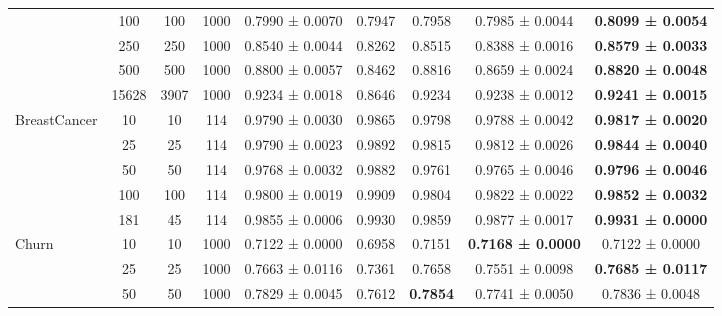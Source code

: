 \begin{table}
{\begin{tabular}[H]{@{}lcccccccc@{}}
                              & 100   & 100  & 1000 & 0.7990 ± 0.0070      & 0.7947               & 0.7958          & 0.7985 ± 0.0044          & \textbf{0.8099 ± 0.0054} \\
                              & 250   & 250  & 1000 & 0.8540 ± 0.0044      & 0.8262               & 0.8515          & 0.8388 ± 0.0016          & \textbf{0.8579 ± 0.0033} \\
                              & 500   & 500  & 1000 & 0.8800 ± 0.0057      & 0.8462               & 0.8816          & 0.8659 ± 0.0024          & \textbf{0.8820 ± 0.0048} \\
                              & 15628 & 3907 & 1000 & 0.9234 ± 0.0018      & 0.8646               & 0.9234          & 0.9238 ± 0.0012          & \textbf{0.9241 ± 0.0015} \\
                              \midrule
\multirow{5}{*}{BreastCancer} & 10    & 10   & 114  & 0.9790 ± 0.0030      & 0.9865               & 0.9798          & 0.9788 ± 0.0042          & \textbf{0.9817 ± 0.0020} \\
                              & 25    & 25   & 114  & 0.9790 ± 0.0023      & 0.9892               & 0.9815          & 0.9812 ± 0.0026          & \textbf{0.9844 ± 0.0040} \\
                              & 50    & 50   & 114  & 0.9768 ± 0.0032      & 0.9882               & 0.9761          & 0.9765 ± 0.0046          & \textbf{0.9796 ± 0.0046} \\
                              & 100   & 100  & 114  & 0.9800 ± 0.0019      & 0.9909               & 0.9804          & 0.9822 ± 0.0022          & \textbf{0.9852 ± 0.0032} \\
                              & 181   & 45   & 114  & 0.9855 ± 0.0006      & 0.9930               & 0.9859          & 0.9877 ± 0.0017          & \textbf{0.9931 ± 0.0000} \\
                              \midrule
\multirow{7}{*}{Churn}        & 10    & 10   & 1000 & 0.7122 ± 0.0000      & 0.6958               & 0.7151          & \textbf{0.7168 ± 0.0000} & 0.7122 ± 0.0000          \\
                              & 25    & 25   & 1000 & 0.7663 ± 0.0116      & 0.7361               & 0.7658          & 0.7551 ± 0.0098          & \textbf{0.7685 ± 0.0117} \\
                              & 50    & 50   & 1000 & 0.7829 ± 0.0045      & 0.7612               & \textbf{0.7854} & 0.7741 ± 0.0050          & 0.7836 ± 0.0048          \\

\end{tabular}}
\end{table}
